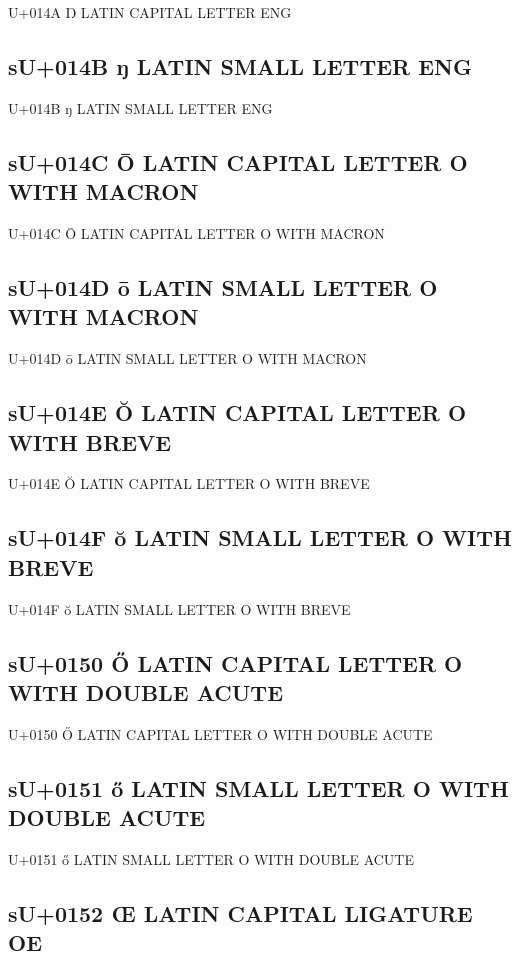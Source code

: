 U+014A Ŋ  LATIN CAPITAL LETTER ENG

\subsection{sU+014B ŋ  LATIN SMALL LETTER ENG}

U+014B ŋ  LATIN SMALL LETTER ENG

\subsection{sU+014C Ō  LATIN CAPITAL LETTER O WITH MACRON}

U+014C Ō  LATIN CAPITAL LETTER O WITH MACRON

\subsection{sU+014D ō  LATIN SMALL LETTER O WITH MACRON}

U+014D ō  LATIN SMALL LETTER O WITH MACRON

\subsection{sU+014E Ŏ  LATIN CAPITAL LETTER O WITH BREVE}

U+014E Ŏ  LATIN CAPITAL LETTER O WITH BREVE

\subsection{sU+014F ŏ  LATIN SMALL LETTER O WITH BREVE}

U+014F ŏ  LATIN SMALL LETTER O WITH BREVE

\subsection{sU+0150 Ő  LATIN CAPITAL LETTER O WITH DOUBLE ACUTE}

U+0150 Ő  LATIN CAPITAL LETTER O WITH DOUBLE ACUTE

\subsection{sU+0151 ő  LATIN SMALL LETTER O WITH DOUBLE ACUTE}

U+0151 ő  LATIN SMALL LETTER O WITH DOUBLE ACUTE

\subsection{sU+0152 Œ  LATIN CAPITAL LIGATURE OE}

